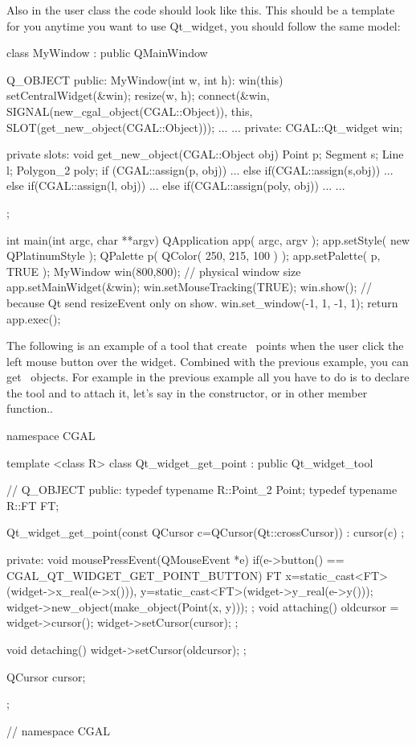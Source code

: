 Also in the user class the code should look like this. This should be a 
template for you anytime you want to use Qt\_widget, you should follow the same
model:
\begin{ccExampleCode}
class MyWindow : public QMainWindow
{
  Q_OBJECT
public:
  MyWindow(int w, int h): win(this) {
    setCentralWidget(&win);
    resize(w, h);
    connect(&win, SIGNAL(new_cgal_object(CGAL::Object)), 
      this, SLOT(get_new_object(CGAL::Object)));
   ...
  }
  ...
private:
  CGAL::Qt_widget	  win;		

private slots:
  void get_new_object(CGAL::Object obj)
  {
    Point p;
    Segment s;
    Line l;
    Polygon_2 poly;
    if (CGAL::assign(p, obj)) {
       ...
    } else if(CGAL::assign(s,obj)) {
       ...      
    } else if(CGAL::assign(l, obj)) {
       ...
    } else if(CGAL::assign(poly, obj)) {
       ...
    }
    ...
  }
};

int
main(int argc, char **argv)
{
  QApplication app( argc, argv );
    app.setStyle( new QPlatinumStyle );
    QPalette p( QColor( 250, 215, 100 ) );
    app.setPalette( p, TRUE );
  MyWindow win(800,800); // physical window size
  app.setMainWidget(&win);
  win.setMouseTracking(TRUE);
  win.show();
  // because Qt send resizeEvent only on show.
  win.set_window(-1, 1, -1, 1);
  return app.exec();
}

\end{ccExampleCode}

The following is an example of a tool that create \cgal\ points when the user 
click the left mouse button over the widget. Combined with the previous 
example, you can get \cgal\ objects. For example in the previous example all 
you have to do is to declare the tool and to attach it, let's say in the 
constructor, or in other member function..
 
\begin{ccExampleCode}
namespace CGAL {

template <class R>
class Qt_widget_get_point : public Qt_widget_tool
{
  //  Q_OBJECT
public:
  typedef typename R::Point_2	Point;
  typedef typename R::FT	FT;
  
  Qt_widget_get_point(const QCursor c=QCursor(Qt::crossCursor)) :
    cursor(c) {};
  
private:
  void mousePressEvent(QMouseEvent *e)
  {
    if(e->button() == CGAL_QT_WIDGET_GET_POINT_BUTTON)
    {
      FT
        x=static_cast<FT>(widget->x_real(e->x())),
        y=static_cast<FT>(widget->y_real(e->y()));
      widget->new_object(make_object(Point(x, y)));
    }
  };
  void attaching()
  {
    oldcursor = widget->cursor();
    widget->setCursor(cursor);
  };
  
  void detaching()
  {
    widget->setCursor(oldcursor);
  };

  QCursor cursor;
};

} // namespace CGAL
\end{ccExampleCode}

